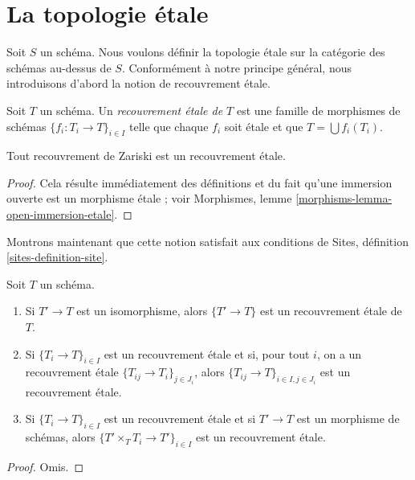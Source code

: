 \section{La topologie \'etale}
\label{section-etale}

\noindent
Soit $S$ un schéma. Nous voulons définir la topologie \'etale sur
la catégorie des schémas au-dessus de $S$. Conformément à notre principe général,
nous introduisons d'abord la notion de recouvrement \'etale.

\begin{definition}
\label{definition-etale-covering}
Soit $T$ un schéma. Un {\it recouvrement \'etale de $T$} est une famille
de morphismes de schémas $\{f_i : T_i \to T\}_{i \in I}$
telle que chaque $f_i$ soit \'etale et que $T = \bigcup f_i(T_i)$.
\end{definition}

\begin{lemma}
\label{lemma-zariski-etale}
Tout recouvrement de Zariski est un recouvrement \'etale.
\end{lemma}

\begin{proof}
Cela résulte immédiatement des définitions et du fait qu'une immersion ouverte
est un morphisme \'etale ; voir
Morphismes, lemme \ref{morphisms-lemma-open-immersion-etale}.
\end{proof}

\noindent
Montrons maintenant que cette notion satisfait aux conditions de
Sites, définition \ref{sites-definition-site}.

\begin{lemma}
\label{lemma-etale}
Soit $T$ un schéma.
\begin{enumerate}
\item Si $T' \to T$ est un isomorphisme, alors $\{T' \to T\}$
est un recouvrement \'etale de $T$.
\item Si $\{T_i \to T\}_{i\in I}$ est un recouvrement \'etale et si, pour tout
$i$, on a un recouvrement \'etale $\{T_{ij} \to T_i\}_{j\in J_i}$, alors
$\{T_{ij} \to T\}_{i \in I, j\in J_i}$ est un recouvrement \'etale.
\item Si $\{T_i \to T\}_{i\in I}$ est un recouvrement \'etale
et si $T' \to T$ est un morphisme de schémas, alors
$\{T' \times_T T_i \to T'\}_{i\in I}$ est un recouvrement \'etale.
\end{enumerate}
\end{lemma}

\begin{proof}
Omis.
\end{proof}

